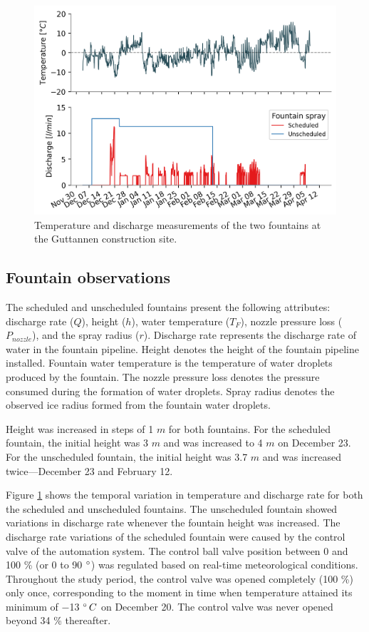 \documentclass[tc, manuscript]{copernicus}
\begin{document}
\begin{figure}[htb]
\includegraphics[width=12cm]{Figures/disvstemp.png}
\caption{Temperature and discharge measurements of the two fountains at the Guttannen construction site.}
\label{fig:aws} 
\end{figure}

\subsection{Fountain observations}

The scheduled and unscheduled fountains present the following attributes: discharge rate ($Q$), height ($h$), water
temperature ($T_F$), nozzle pressure loss ($P_{nozzle}$), and the spray radius ($r$). Discharge rate represents
the discharge rate of water in the fountain pipeline. Height denotes the height of the fountain pipeline
installed. Fountain water temperature is the temperature of water droplets produced by the fountain. The nozzle
pressure loss denotes the pressure consumed during the formation of water droplets. Spray radius denotes the
observed ice radius formed from the fountain water droplets.

Height was increased in steps of 1 $m$ for both fountains. For the scheduled fountain, the
initial height was 3 $m$ and was increased to 4 $m$ on December 23. For the unscheduled
fountain, the initial height was 3.7 $m$ and was increased twice---December
23 and February 12.

Figure \ref{fig:aws} shows the temporal variation in temperature and discharge rate for both the scheduled and
unscheduled fountains. The unscheduled fountain showed variations in discharge rate whenever the fountain height
was increased. The discharge rate variations of the scheduled fountain were caused by the control valve of the
automation system. The control ball valve position between 0 and 100 \% (or 0 to 90 $^{\circ}$) was regulated
based on real-time meteorological conditions. Throughout the study period, the control valve was opened
completely (100 \%) only once, corresponding to the moment in time when temperature attained its minimum of $-$13
$^{\circ} \, C$ on December 20. The control valve was never opened beyond 34 \% thereafter.  
\end{document}
